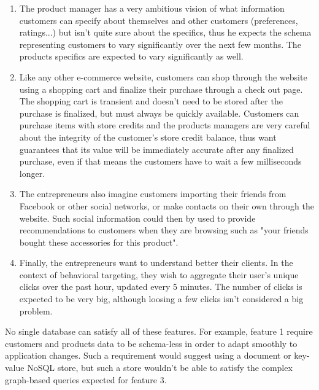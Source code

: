 \begin{enumerate}[label=(\alph*)]
\item{The product manager has a very ambitious vision of what information customers can specify about themselves and other customers (preferences, ratings...) but isn't quite sure about the specifics, thus he expects the schema representing customers to vary significantly over the next few months. The products specifics are expected to vary significantly as well.}
\item{Like any other e-commerce website, customers can shop through the website using a shopping cart and finalize their purchase through a check out page. The shopping cart is transient and doesn't need to be stored after the purchase is finalized, but must always be quickly available. Customers can purchase items with store credits and the products managers are very careful about the integrity of the customer's store credit balance, thus want guarantees that its value will be immediately accurate after any finalized purchase, even if that means the customers have to wait a few milliseconds longer.}
\item{The entrepreneurs also imagine customers importing their friends from Facebook or other social networks, or make contacts on their own through the website. Such social information could then by used to provide recommendations to customers when they are browsing such as "your friends bought these accessories for this product".}
\item{Finally, the entrepreneurs want to understand better their clients. In the context of behavioral targeting, they wish to aggregate their user's unique clicks over the past hour, updated every 5 minutes. The number of clicks is expected to be very big, although loosing a few clicks isn't considered a big problem.}
\end{enumerate}


No single database can satisfy all of these features. For example, feature 1 require customers and products data to be schema-less in order to adapt smoothly to application changes. Such a requirement would suggest using a document or key-value NoSQL store, but such a store wouldn't be able to satisfy the complex graph-based queries expected for feature 3.

